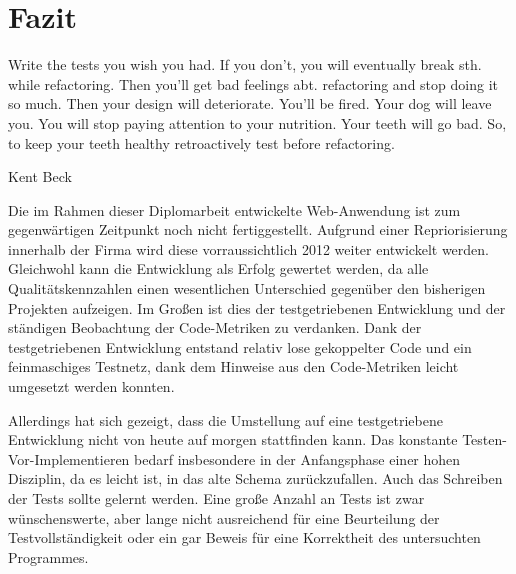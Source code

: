 \chapter{Fazit}
\label{sec:fazit}
\epigraph{Write the tests you wish you had. If you don’t, you will eventually break sth. while refactoring. Then you’ll get bad feelings abt. refactoring and stop doing it so much. Then your design will deteriorate. You’ll be fired. Your dog will leave you. You will stop paying attention to your nutrition. Your teeth will go bad. So, to keep your teeth healthy retroactively test before refactoring.}{Kent Beck \citep{beck_test_2002}}

Die im Rahmen dieser Diplomarbeit entwickelte Web-Anwendung ist zum gegenwärtigen Zeitpunkt noch nicht fertiggestellt. Aufgrund einer Repriorisierung innerhalb der Firma wird diese vorraussichtlich 2012 weiter entwickelt werden. Gleichwohl kann die Entwicklung als Erfolg gewertet werden, da alle Qualitätskennzahlen einen wesentlichen Unterschied gegenüber den bisherigen Projekten aufzeigen. Im Großen ist dies der testgetriebenen Entwicklung und der ständigen Beobachtung der Code-Metriken zu verdanken. Dank der testgetriebenen Entwicklung entstand relativ lose gekoppelter Code und ein feinmaschiges Testnetz, dank dem Hinweise aus den Code-Metriken leicht umgesetzt werden konnten.

Allerdings hat sich gezeigt, dass die Umstellung auf eine testgetriebene Entwicklung nicht von heute auf morgen stattfinden kann. Das konstante Testen-Vor\hyp{}Implementieren bedarf insbesondere in der Anfangsphase einer hohen Disziplin, da es leicht ist, in das alte Schema zurückzufallen. Auch das Schreiben der Tests sollte gelernt werden. Eine große Anzahl an Tests ist zwar wünschenswerte, aber lange nicht ausreichend für eine Beurteilung der Testvollständigkeit oder ein gar Beweis für eine Korrektheit des untersuchten Programmes.

